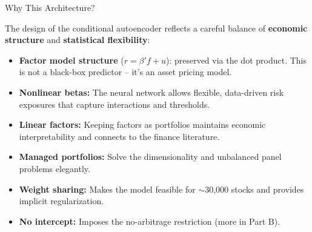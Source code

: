 \documentclass[aspectratio=169]{beamer}
\begin{document}
%
%
\begin{frame}{Why This Architecture?}

The design of the conditional autoencoder reflects a careful balance of \textbf{economic structure} and \textbf{statistical flexibility}:

\vspace{0.5em}
\begin{itemize}
    \item \textbf{Factor model structure} ($r = \beta' f + u$): preserved via the dot product. This is not a black-box predictor -- it's an asset pricing model.
    
    \vspace{0.3em}
    \item \textbf{Nonlinear betas:} The neural network allows flexible, data-driven risk exposures that capture interactions and thresholds.
    
    \vspace{0.3em}
    \item \textbf{Linear factors:} Keeping factors as portfolios maintains economic interpretability and connects to the finance literature.
    
    \vspace{0.3em}
    \item \textbf{Managed portfolios:} Solve the dimensionality and unbalanced panel problems elegantly.
    
    \vspace{0.3em}
    \item \textbf{Weight sharing:} Makes the model feasible for $\sim$30,000 stocks and provides implicit regularization.
    
    \vspace{0.3em}
    \item \textbf{No intercept:} Imposes the no-arbitrage restriction (more in Part B).
\end{itemize}
\end{frame}
%
%
\end{document}
